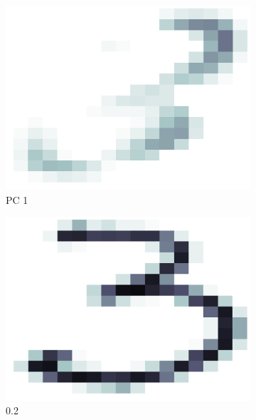\documentclass[a4paper, 10pt]{article}
\begin{document}
  \begin{figure}[h]
    \centering
    \begin{subfigure}[t]{0.16\linewidth}
      \includegraphics[width=1\linewidth]{./lab3/PCA/PC_interpret/PC1.png}
      \caption{PC 1}
      \label{fig:PC1}
    \end{subfigure}
    \begin{subfigure}[t]{0.16\linewidth}
      \includegraphics[width=1\linewidth]{./lab3/PCA/PC_interpret/PC1_02.png}
      \caption{0.2}
      \label{fig:quant02}
    \end{subfigure}
    \begin{subfigure}[t]{0.16\linewidth}

\end{subfigure}
\end{figure}
\end{document}
